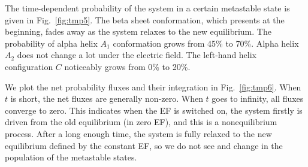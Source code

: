\documentclass[a4paper,preprint,unsortedaddress,onecolumn]{revtex4-1}
\begin{document}
The time-dependent probability of the system in a certain metastable state is given in
Fig.~\ref{fig:tmp5}. The beta sheet conformation,
which presents at the beginning,
fades away as the system relaxes to the new equilibrium. The
probability of alpha helix $A_1$ conformation grows from 45\% to 70\%.
Alpha helix $A_2$  does not change a lot under the electric field.
The left-hand helix configuration $C$ noticeably grows from 0\% to 20\%.

We plot the net probability fluxes and their integration in Fig.~\ref{fig:tmp6}.
When $t$ is short, the net fluxes are generally non-zero.
When $t$ goes to infinity,
all fluxes converge to zero. This indicates
when the EF is switched on, the system firstly is driven from the old
equilibrium (in zero EF), and this is a nonequilibrium process.
After a long enough time, the system
is fully relaxed to the new equilibrium defined by the constant EF,
so we do not see and change
in the population of the metastable states.
\end{document}
